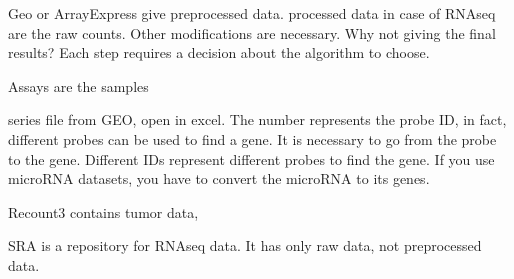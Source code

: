 Geo or ArrayExpress give preprocessed data. processed data in case of RNAseq are the raw counts. Other modifications are necessary. Why not giving the final results? Each step requires a decision about the algorithm to choose.


Assays are the samples


series file from GEO, open in excel. The number represents the probe ID, in fact, different probes can be used to find a gene. It is necessary to go from the probe to the gene. Different IDs represent different probes to find the gene. If you use microRNA datasets, you have to convert the microRNA to its genes. 

Recount3 contains tumor data,  

SRA is a repository for RNAseq data. It has only raw data, not preprocessed data. 